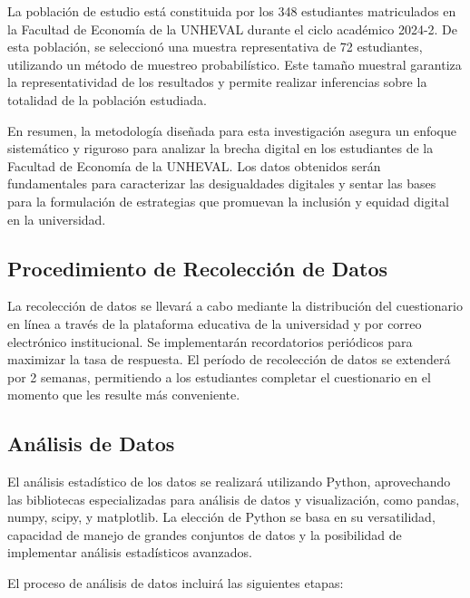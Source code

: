 \documentclass[12pt, a4paper]{article}
\begin{document}
La población de estudio está constituida por los 348 estudiantes matriculados en la Facultad de Economía de la UNHEVAL durante el ciclo académico 2024-2. De esta población, se seleccionó una muestra representativa de 72 estudiantes, utilizando un método de muestreo probabilístico. Este tamaño muestral garantiza la representatividad de los resultados y permite realizar inferencias sobre la totalidad de la población estudiada.  

En resumen, la metodología diseñada para esta investigación asegura un enfoque sistemático y riguroso para analizar la brecha digital en los estudiantes de la Facultad de Economía de la UNHEVAL. Los datos obtenidos serán fundamentales para caracterizar las desigualdades digitales y sentar las bases para la formulación de estrategias que promuevan la inclusión y equidad digital en la universidad.

\subsection{Procedimiento de Recolección de Datos}

La recolección de datos se llevará a cabo mediante la distribución del cuestionario en línea a través de la plataforma educativa de la universidad y por correo electrónico institucional. Se implementarán recordatorios periódicos para maximizar la tasa de respuesta. El período de recolección de datos se extenderá por 2 semanas, permitiendo a los estudiantes completar el cuestionario en el momento que les resulte más conveniente.

\subsection{Análisis de Datos}

El análisis estadístico de los datos se realizará utilizando Python, aprovechando las bibliotecas especializadas para análisis de datos y visualización, como pandas, numpy, scipy, y matplotlib. La elección de Python se basa en su versatilidad, capacidad de manejo de grandes conjuntos de datos y la posibilidad de implementar análisis estadísticos avanzados.

El proceso de análisis de datos incluirá las siguientes etapas:
\end{document}
